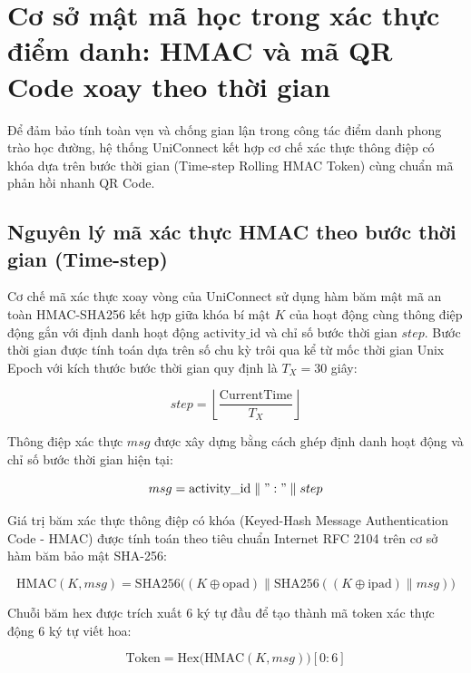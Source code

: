 \section{Cơ sở mật mã học trong xác thực điểm danh: HMAC và mã QR Code xoay theo thời gian}

Để đảm bảo tính toàn vẹn và chống gian lận trong công tác điểm danh phong trào học đường, hệ thống UniConnect kết hợp cơ chế xác thực thông điệp có khóa dựa trên bước thời gian (Time-step Rolling HMAC Token) cùng chuẩn mã phản hồi nhanh QR Code.

\subsection{Nguyên lý mã xác thực HMAC theo bước thời gian (Time-step)}

Cơ chế mã xác thực xoay vòng của UniConnect sử dụng hàm băm mật mã an toàn HMAC-SHA256 kết hợp giữa khóa bí mật $K$ của hoạt động cùng thông điệp động gắn với định danh hoạt động $\text{activity\_id}$ và chỉ số bước thời gian $step$. Bước thời gian được tính toán dựa trên số chu kỳ trôi qua kể từ mốc thời gian Unix Epoch với kích thước bước thời gian quy định là $T_X = 30$ giây:

\begin{equation}
step = \left\lfloor \frac{\text{CurrentTime}}{T_X} \right\rfloor
\end{equation}

Thông điệp xác thực $msg$ được xây dựng bằng cách ghép định danh hoạt động và chỉ số bước thời gian hiện tại:

\begin{equation}
msg = \text{activity\_id} \parallel ":" \parallel step
\end{equation}

Giá trị băm xác thực thông điệp có khóa (Keyed-Hash Message Authentication Code - HMAC) được tính toán theo tiêu chuẩn Internet RFC 2104 trên cơ sở hàm băm bảo mật SHA-256:

\begin{equation}
\text{HMAC}(K, msg) = \text{SHA256}\big((K \oplus \text{opad}) \parallel \text{SHA256}((K \oplus \text{ipad}) \parallel msg)\big)
\end{equation}

Chuỗi băm hex được trích xuất 6 ký tự đầu để tạo thành mã token xác thực động 6 ký tự viết hoa:

\begin{equation}
\text{Token} = \text{Hex}\big(\text{HMAC}(K, msg)\big)[0:6]
\end{equation}

